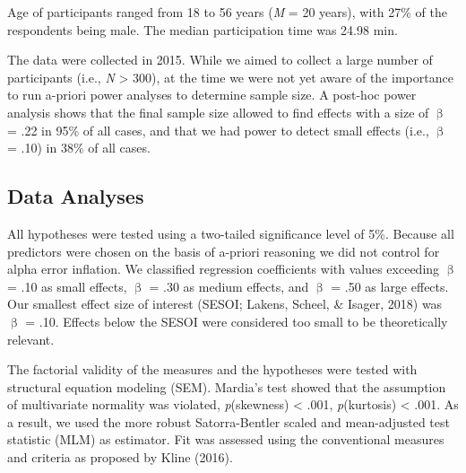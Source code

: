 \documentclass[man,floatsintext]{apa6}
\begin{document}
Age of participants ranged from 18 to 56 years (\emph{M} = 20 years), with 27\% of the respondents being male. The median participation time was 24.98 min.

The data were collected in 2015. While we aimed to collect a large number of participants (i.e., \emph{N} \textgreater{} 300), at the time we were not yet aware of the importance to run a-priori power analyses to determine sample size. A post-hoc power analysis shows that the final sample size allowed to find effects with a size of \(\upbeta\) = .22 in 95\% of all cases, and that we had power to detect small effects (i.e., \(\upbeta\) = .10) in 38\% of all cases.

\hypertarget{data-analyses}{%
\subsection{Data Analyses}\label{data-analyses}}

All hypotheses were tested using a two-tailed significance level of 5\%. Because all predictors were chosen on the basis of a-priori reasoning we did not control for alpha error inflation. We classified regression coefficients with values exceeding \textbar{}\(\upbeta\)\textbar{} = .10 as small effects, \textbar{}\(\upbeta\)\textbar{} = .30 as medium effects, and \textbar{}\(\upbeta\)\textbar{} = .50 as large effects. Our smallest effect size of interest (SESOI; Lakens, Scheel, \& Isager, 2018) was \textbar{}\(\upbeta\)\textbar{} = .10. Effects below the SESOI were considered too small to be theoretically relevant.

The factorial validity of the measures and the hypotheses were tested with structural equation modeling (SEM). Mardia's test showed that the assumption of multivariate normality was violated, \emph{p}(skewness) \textless{} .001, \emph{p}(kurtosis) \textless{} .001. As a result, we used the more robust Satorra-Bentler scaled and mean-adjusted test statistic (MLM) as estimator. Fit was assessed using the conventional measures and criteria as proposed by Kline (2016).
\end{document}
